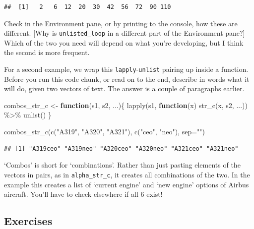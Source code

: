 \documentclass[
]{book}
\newenvironment{Shaded}{\begin{snugshade}}{\end{snugshade}}
\newcommand{\AttributeTok}[1]{\textcolor[rgb]{0.77,0.63,0.00}{#1}}
\newcommand{\ControlFlowTok}[1]{\textcolor[rgb]{0.13,0.29,0.53}{\textbf{#1}}}
\newcommand{\FunctionTok}[1]{\textcolor[rgb]{0.00,0.00,0.00}{#1}}
\newcommand{\NormalTok}[1]{#1}
\newcommand{\OtherTok}[1]{\textcolor[rgb]{0.56,0.35,0.01}{#1}}
\newcommand{\SpecialCharTok}[1]{\textcolor[rgb]{0.00,0.00,0.00}{#1}}
\newcommand{\StringTok}[1]{\textcolor[rgb]{0.31,0.60,0.02}{#1}}
\begin{document}
\begin{verbatim}
##  [1]   2   6  12  20  30  42  56  72  90 110
\end{verbatim}

Check in the Environment pane, or by printing to the console, how these are different. {[}Why is \texttt{unlisted\_loop} in a different part of the Environment pane?{]} Which of the two you need will depend on what you're developing, but I think the second is more frequent.

For a second example, we wrap this \texttt{lapply}-\texttt{unlist} pairing up inside a function. Before you run this code chunk, or read on to the end, describe in words what it will do, given two vectors of text. The answer is a couple of paragraphs earlier.

\begin{Shaded}
\begin{Highlighting}[]
\NormalTok{combos\_str\_c }\OtherTok{\textless{}{-}} \ControlFlowTok{function}\NormalTok{(s1, s2, ...)\{}
  \FunctionTok{lapply}\NormalTok{(s1, }\ControlFlowTok{function}\NormalTok{(x) }\FunctionTok{str\_c}\NormalTok{(x, s2, ...)) }\SpecialCharTok{\%\textgreater{}\%} 
    \FunctionTok{unlist}\NormalTok{()}
\NormalTok{\}}

\FunctionTok{combos\_str\_c}\NormalTok{(}\FunctionTok{c}\NormalTok{(}\StringTok{"A319"}\NormalTok{, }\StringTok{"A320"}\NormalTok{, }\StringTok{"A321"}\NormalTok{), }\FunctionTok{c}\NormalTok{(}\StringTok{"ceo"}\NormalTok{, }\StringTok{"neo"}\NormalTok{), }\AttributeTok{sep=}\StringTok{""}\NormalTok{)}
\end{Highlighting}
\end{Shaded}

\begin{verbatim}
## [1] "A319ceo" "A319neo" "A320ceo" "A320neo" "A321ceo" "A321neo"
\end{verbatim}

`Combos' is short for `combinations'. Rather than just pasting elements of the vectors in pairs, as in \texttt{alpha\_str\_c}, it creates all combinations of the two. In the example this creates a list of `current engine' and `new engine' options of Airbus aircraft. You'll have to check elsewhere if all 6 exist!

\hypertarget{exercises-3}{%
\subsection{Exercises}\label{exercises-3}}
\end{document}

